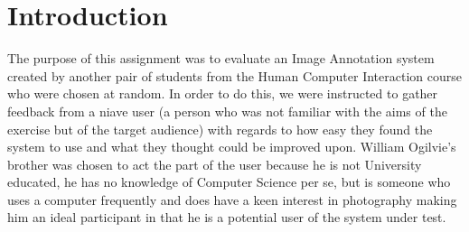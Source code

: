 \section{Introduction}

The purpose of this assignment was to evaluate an Image Annotation system created by another pair of students from the Human Computer Interaction course who were chosen at random.  In order to do this, we were instructed to gather feedback from a niave user (a person who was not familiar with the aims of the exercise but of the target audience) with regards to how easy they found the system to use and what they thought could be improved upon.  William Ogilvie’s brother was chosen to act the part of the user because he is not University educated, he has no knowledge of Computer Science per se, but is someone who uses a computer frequently and does have a keen interest in photography making him an ideal participant in that he is a potential user of the system under test.

